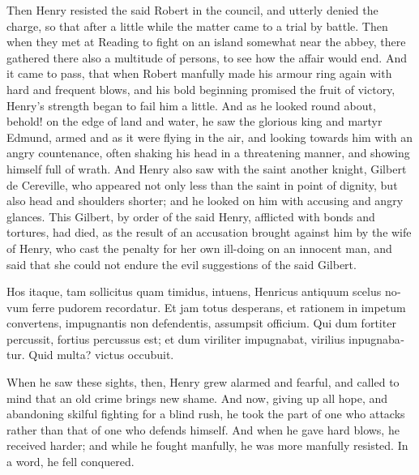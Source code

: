 \documentclass[10pt]{book}
\begin{document}
\begin{paracol}{2}
\begin{otherlanguage}{latin}
\end{otherlanguage}

\switchcolumn

Then Henry resisted the said Robert in the council, and utterly denied the charge, so that after a little while the matter came to a trial by battle. Then when they met at Reading to fight on an island somewhat near the abbey, there gathered there also a multitude of persons, to see how the affair would end. And it came to pass, that when Robert manfully made his armour ring again with hard and frequent blows, and his bold beginning promised the fruit of victory, Henry's strength began to fail him a little. And as he looked round about, behold! on the edge of land and water, he saw the glorious king and martyr Edmund, armed and as it were flying in the air, and looking towards him with an angry countenance, often shaking his head in a threatening manner, and showing himself full of wrath. And Henry also saw with the saint another knight, Gilbert de Cereville, who appeared not only less than the saint in point of dignity, but also head and shoulders shorter; and he looked on him with accusing and angry glances. This Gilbert, by order of the said Henry, afflicted with bonds and tortures, had died, as the result of an accusation brought against him by the wife of Henry, who cast the penalty for her own ill-doing on an innocent man, and said that she could not endure the evil suggestions of the said Gilbert.

\switchcolumn*

\begin{otherlanguage}{latin}
Hos itaque, tam sollicitus quam timidus, intuens, Henricus antiquum scelus novum ferre pudorem recordatur. Et jam totus desperans, et rationem in impetum convertens, impugnantis non defendentis, assumpsit officium. Qui dum fortiter percussit, fortius percussus est; et dum viriliter impugnabat, virilius inpugnabatur. Quid multa? victus occubuit.
\end{otherlanguage}

\switchcolumn

When he saw these sights, then, Henry grew alarmed and fearful, and called to mind that an old crime brings new shame. And now, giving up all hope, and abandoning skilful fighting for a blind rush, he took the part of one who attacks rather than that of one who defends himself. And when he gave hard blows, he received harder; and while he fought manfully, he was more manfully resisted. In a word, he fell conquered.


\end{paracol}
\end{document}

